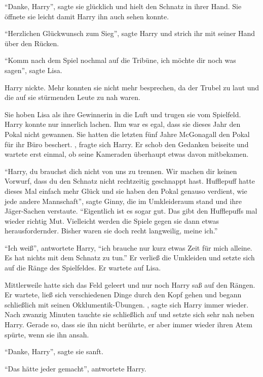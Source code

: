 \enquote{Danke, Harry}, sagte sie glücklich und hielt den Schnatz in ihrer Hand. Sie öffnete sie leicht damit Harry ihn auch sehen konnte.

\enquote{Herzlichen Glückwunsch zum Sieg}, sagte Harry und strich ihr mit seiner Hand über den Rücken.

\enquote{Komm nach dem Spiel nochmal auf die Tribüne, ich möchte dir noch was sagen}, sagte Lisa.

Harry nickte. Mehr konnten sie nicht mehr besprechen, da der Trubel zu laut und die auf sie stürmenden Leute zu nah waren.

Sie hoben Lisa als ihre Gewinnerin in die Luft und trugen sie vom Spielfeld. Harry konnte nur innerlich lachen. Ihm war es egal, dass sie dieses Jahr den Pokal nicht gewannen. Sie hatten die letzten fünf Jahre McGonagall den Pokal für ihr Büro beschert. , fragte sich Harry. Er schob den Gedanken beiseite und wartete erst einmal, ob seine Kameraden überhaupt etwas davon mitbekamen.

\enquote{Harry, du brauchst dich nicht von uns zu trennen. Wir machen dir keinen Vorwurf, dass du den Schnatz nicht rechtzeitig geschnappt hast. Hufflepuff hatte dieses Mal einfach mehr Glück und sie haben den Pokal genauso verdient, wie jede andere Mannschaft}, sagte Ginny, die im Umkleideraum stand und ihre Jäger-Sachen verstaute. \enquote{Eigentlich ist es sogar gut. Das gibt den Hufflepuffs mal wieder richtig Mut. Vielleicht werden die Spiele gegen sie dann etwas herausfordernder. Bisher waren sie doch recht langweilig, meine ich.}

\enquote{Ich weiß}, antwortete Harry, \enquote{ich brauche nur kurz etwas Zeit für mich alleine. Es hat nichts mit dem Schnatz zu tun.} Er verließ die Umkleiden und setzte sich auf die Ränge des Spielfeldes. Er wartete auf Lisa.

Mittlerweile hatte sich das Feld geleert und nur noch Harry saß auf den Rängen. Er wartete, ließ sich verschiedenen Dinge durch den Kopf gehen und begann schließlich mit seinen Okklumentik-Übungen. , sagte sich Harry immer wieder.  Nach zwanzig Minuten tauchte sie schließlich auf und setzte sich sehr nah neben Harry. Gerade so, dass sie ihn nicht berührte, er aber immer wieder ihren Atem spürte, wenn sie ihn ansah.

\enquote{Danke, Harry}, sagte sie sanft.

\enquote{Das hätte jeder gemacht}, antwortete Harry.

